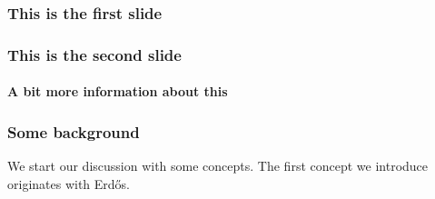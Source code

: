 \documentclass{beamer}
\begin{document}
\begin{frame}
\frametitle{This is the first slide}
\end{frame}
  
\begin{frame}
\frametitle{This is the second slide}
\framesubtitle{A bit more information about this}
\end{frame}

\begin{frame}
\frametitle{Some background}
We start our discussion with some concepts.
\pause
The first concept we introduce originates with Erd\H os.
\end{frame}
\end{document}
